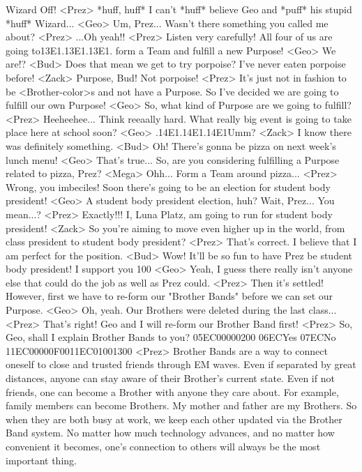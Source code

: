 Wizard Off! 
<Prez> *huff, huff* 
I can't *huff* believe Geo and *puff* his stupid *huff* Wizard... 
<Geo> Um, Prez... Wasn't there something you called me about? 
<Prez> ...Oh yeah!! 
<Prez> Listen very carefully! 
All four of us are going to{13}{E1}.{13}{E1}.{13}{E1}. form a Team and fulfill a new Purpose! 
<Geo> We are!? 
<Bud> Does that mean we get to try porpoise? 
I've never eaten porpoise before! 
<Zack> Purpose, Bud! Not porpoise! 
<Prez> It's just not in fashion to be <Brother-color>s and not have a Purpose. 
So I've decided we are going to fulfill our own Purpose! 
<Geo> So, what kind of Purpose are we going to fulfill? 
<Prez> Heeheehee... Think reeaally hard. 
What really big event is going to take place here at school soon?  
<Geo> .{14}{E1}.{14}{E1}.{14}{E1}Umm? 
<Zack> I know there was definitely something. 
<Bud> Oh! There's gonna be pizza on next week's lunch menu! 
<Geo> That's true... 
So, are you considering fulfilling a Purpose related to pizza, Prez? 
<Mega> Ohh... Form a Team around pizza... 
<Prez> Wrong, you imbeciles! 
Soon there's going to be an election for student body president! 
<Geo> A student body president election, huh? 
Wait, Prez... You mean...? 
<Prez> Exactly!!! 
I, Luna Platz, am going to run for student body president! 
<Zack> So you're aiming to move even higher up in the 
world, from class president to student body president? 
<Prez> That's correct. I believe that I am  perfect for the position. 
<Bud> Wow! 
It'll be so fun to have Prez be student body president! 
I support you 100%
<Geo> Yeah, I guess there really isn't anyone else that 
could do the job as well as Prez could. 
<Prez> Then it's settled! 
However, first we have to re-form our "Brother 
Bands" before we can set our Purpose. 
<Geo> Oh, yeah. 
Our Brothers were deleted during the last class... 
<Prez> That's right! 
Geo and I will re-form our Brother Band first! 
<Prez> So, Geo, shall I explain Brother Bands to you? 
{05}{EC}{00}{00}{02}{00}   {06}{EC}Yes   {07}{EC}No 
{11}{EC}{00}{00}{0F}{00}{11}{EC}{01}{00}{13}{00}
<Prez> Brother Bands are a way to connect oneself to 
close and trusted friends through EM waves. 
Even if separated by great distances, anyone 
can stay aware of their Brother's current state. 
Even if not friends, one can become a Brother with anyone they care about. 
For example, family members can become Brothers. 
My mother and father are my Brothers. So when they are both busy at work, 
we keep each other updated via the Brother Band system. 
No matter how much technology advances, 
and no matter how convenient it becomes, 
one's connection to others will always be the most important thing. 
